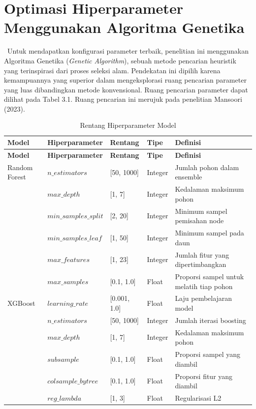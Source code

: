     \section{Optimasi Hiperparameter Menggunakan Algoritma Genetika\method}\label{sec:method construction}\
    Untuk mendapatkan konfigurasi parameter terbaik, penelitian ini menggunakan Algoritma Genetika (\textit{Genetic Algorithm}), sebuah metode pencarian heuristik yang terinspirasi dari proses seleksi alam. Pendekatan ini dipilih karena kemampuannya yang superior dalam mengeksplorasi ruang pencarian parameter yang luas dibandingkan metode konvensional. Ruang pencarian parameter dapat dilihat pada Tabel 3.1. Ruang pencarian ini merujuk pada penelitian Mansoori (2023).
    
    \renewcommand{\arraystretch}{1.2}
    \begin{longtable}{l l l l >{\RaggedRight\arraybackslash}p{3cm}}
    \caption{Rentang Hiperparameter Model} \\
    \toprule
    \textbf{Model} & \textbf{Hiperparameter} & \textbf{Rentang} & \textbf{Tipe} & \textbf{Definisi} \\
    \midrule
    \endfirsthead
    \toprule
    \textbf{Model} & \textbf{Hiperparameter} & \textbf{Rentang} & \textbf{Tipe} & \textbf{Definisi} \\
    \midrule
    \endhead
    
    Random Forest & $n\_estimators$ & [50, 1000] & Integer & Jumlah pohon dalam ensemble \\
     & $max\_depth$ & [1, 7] & Integer & Kedalaman maksimum pohon \\
     & $min\_samples\_split$ & [2, 20] & Integer & Minimum sampel pemisahan node \\
     & $min\_samples\_leaf$ & [1, 50] & Integer & Minimum sampel pada daun \\
     & $max\_features$ & [1, 23] & Integer & Jumlah fitur yang dipertimbangkan \\
     & $max\_samples$ & [0.1, 1.0] & Float & Proporsi sampel untuk melatih tiap pohon \\
    \midrule
    XGBoost & $learning\_rate$ & [0.001, 1.0] & Float & Laju pembelajaran model \\
     & $n\_estimators$ & [50, 1000] & Integer & Jumlah iterasi boosting \\
     & $max\_depth$ & [1, 7] & Integer & Kedalaman maksimum pohon \\
     & $subsample$ & [0.1, 1.0] & Float & Proporsi sampel yang diambil \\
     & $colsample\_bytree$ & [0.1, 1.0] & Float & Proporsi fitur yang diambil \\
     & $reg\_lambda$ & [1, 3] & Float & Regularisasi L2 \\
    \bottomrule
    \end{longtable}
